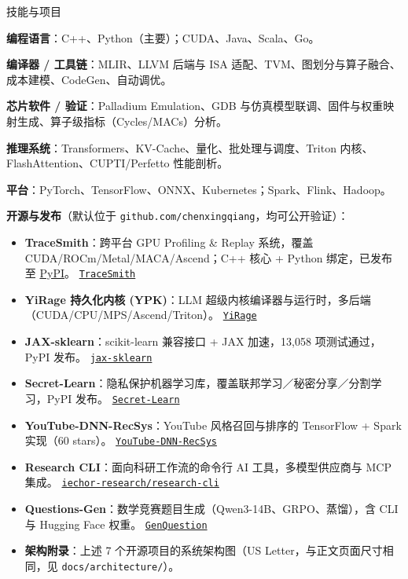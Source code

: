 \documentclass{resume} %
\newcommand{\repo}[2]{\href{#2}{\small\nolinkurl{#1}}}
\begin{document}
\begin{rSection}{技能与项目}

 \item {\bf 编程语言}：C++、Python（主要）；CUDA、Java、Scala、Go。

 \item {\bf 编译器 / 工具链}：MLIR、LLVM 后端与 ISA 适配、TVM、图划分与算子融合、成本建模、CodeGen、自动调优。

 \item {\bf 芯片软件 / 验证}：Palladium Emulation、GDB 与仿真模型联调、固件与权重映射生成、算子级指标（Cycles/MACs）分析。

 \item {\bf 推理系统}：Transformers、KV-Cache、量化、批处理与调度、Triton 内核、FlashAttention、CUPTI/Perfetto 性能剖析。

 \item {\bf 平台}：PyTorch、TensorFlow、ONNX、Kubernetes；Spark、Flink、Hadoop。

\item{\bf 开源与发布}（默认位于 \nolinkurl{github.com/chenxingqiang}，均可公开验证）：

\begin{itemize}
  \item {\bf TraceSmith}：跨平台 GPU Profiling \& Replay 系统，覆盖 CUDA/ROCm/Metal/MACA/Ascend；C++ 核心 + Python 绑定，已发布至 \href{https://pypi.org/project/tracesmith/}{PyPI}。 \repo{TraceSmith}{https://github.com/chenxingqiang/TraceSmith}
  \item {\bf YiRage 持久化内核 (YPK)}：LLM 超级内核编译器与运行时，多后端（CUDA/CPU/MPS/Ascend/Triton）。 \repo{YiRage}{https://github.com/chenxingqiang/YiRage}
  \item {\bf JAX-sklearn}：scikit-learn 兼容接口 + JAX 加速，13{,}058 项测试通过，PyPI 发布。 \repo{jax-sklearn}{https://github.com/chenxingqiang/jax-sklearn}
  \item {\bf Secret-Learn}：隐私保护机器学习库，覆盖联邦学习／秘密分享／分割学习，PyPI 发布。 \repo{Secret-Learn}{https://github.com/chenxingqiang/Secret-Learn}
  \item {\bf YouTube-DNN-RecSys}：YouTube 风格召回与排序的 TensorFlow + Spark 实现（60 stars）。 \repo{YouTube-DNN-RecSys}{https://github.com/chenxingqiang/YouTube-DNN-RecSys}
  \item {\bf Research CLI}：面向科研工作流的命令行 AI 工具，多模型供应商与 MCP 集成。 \repo{iechor-research/research-cli}{https://github.com/iechor-research/research-cli}
  \item {\bf Questions-Gen}：数学竞赛题目生成（Qwen3-14B、GRPO、蒸馏），含 CLI 与 Hugging Face 权重。 \repo{GenQuestion}{https://github.com/chenxingqiang/GenQuestion}
  \item {{\bf 架构附录}：上述 7 个开源项目的系统架构图（US Letter，与正文页面尺寸相同，见 \nolinkurl{docs/architecture/}）。}
\end{itemize}

\end{rSection}
\end{document}
